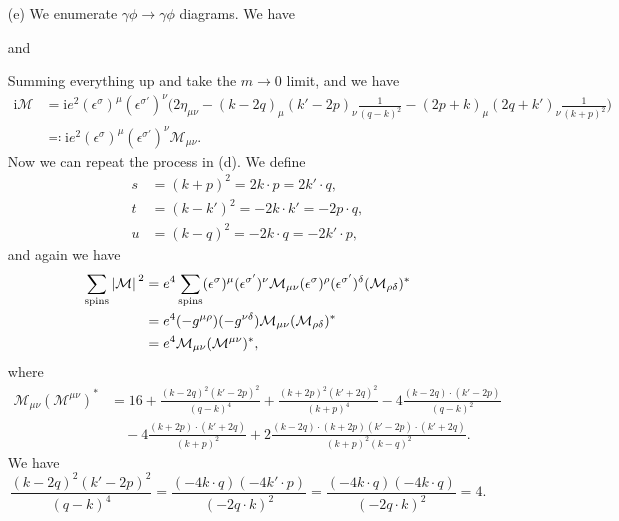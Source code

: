 \documentclass[hyperref, a4paper]{article}
\newcommand*{\ii}{\mathrm{i}}
\begin{document}
\begin{itemize}
\item[(e)] We enumerate $\gamma \phi \to \gamma \phi$ diagrams. We have 


and 

Summing everything up and take the $m \to 0$ limit, and we have 
\begin{equation}
    \begin{aligned}
        \ii \mathcal{M}& = \ii e^2 (\epsilon^\sigma)^\mu (\epsilon^{\sigma'})^\nu \Big( 2 \eta_{\mu \nu} - (k-2q)_\mu (k'-2p)_\nu \frac{1}{(q-k)^2  }  - (2p+k)_\mu (2q+k')_\nu \frac{1}{(k+p)^2  }  \Big) \\
        &\eqqcolon \ii e^2 (\epsilon^\sigma)^\mu (\epsilon^{\sigma'})^\nu \mathcal{M}_{\mu \nu}.
    \end{aligned}
\end{equation}
Now we can repeat the process in (d). We define 
\begin{equation}
    \begin{aligned}
        s &= (k+p)^2 = 2 k \cdot p = 2 k' \cdot q, \\
        t &= (k - k')^2 = - 2 k \cdot k' = - 2 p \cdot q, \\
        u &= (k - q)^2 = - 2 k \cdot q = - 2 k' \cdot p,
    \end{aligned}
\end{equation}
and again we have 
\[
    \begin{aligned}
        \sum_\text{spins} \abs*{\mathcal{M}}^2 &= 
        e^4 \sum_\text{spins} (\epsilon^\sigma)^\mu (\epsilon^{\sigma'})^\nu \mathcal{M}_{\mu \nu}
        (\epsilon^\sigma)^\rho (\epsilon^{\sigma'})^\delta (\mathcal{M}_{\rho \delta})^* \\
        &= e^4 (- g^{\mu \rho}) (- g^{\nu \delta}) \mathcal{M}_{\mu \nu} (\mathcal{M}_{\rho \delta})^* \\
        &= e^4 \mathcal{M}_{\mu \nu} (\mathcal{M}^{\mu \nu})^*,
    \end{aligned}
\]
where 
\[
    \begin{aligned}
        \mathcal{M}_{\mu \nu} (\mathcal{M}^{\mu \nu})^* &= 16 + \frac{(k-2q)^2 (k'-2p)^2}{(q-k)^4} 
        + \frac{(k+2p)^2 (k'+2q)^2}{(k+p)^4} - 4 \frac{(k-2q) \cdot (k'-2p)}{(q-k)^2} \\
        &\quad - 4 \frac{(k+2p) \cdot (k'+2q)}{(k+p)^2} + 2 \frac{(k-2q) \cdot (k+2p) (k'-2p) \cdot (k'+2q)}{(k+p)^2 (k-q)^2} .
    \end{aligned}
\]
We have 
\[
    \frac{(k-2q)^2 (k'-2p)^2}{(q-k)^4} = \frac{(-4 k \cdot q) (-4 k' \cdot p)}{(-2 q \cdot k)^2 } = \frac{(-4 k \cdot q) (-4 k \cdot q)}{(-2 q \cdot k)^2 } = 4.
\]
\end{itemize}
\end{document}
